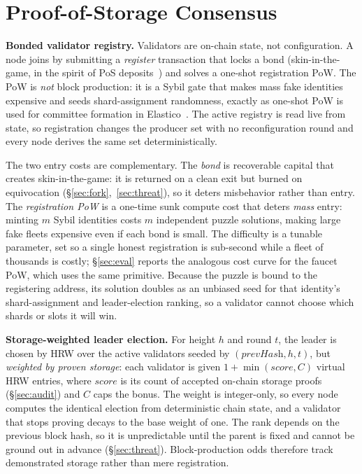 \section{Proof-of-Storage Consensus}
\label{sec:consensus}
\textbf{Bonded validator registry.} Validators are on-chain state, not configuration. A node
joins by submitting a \emph{register} transaction that locks a bond (skin-in-the-game, in the
spirit of PoS deposits~\cite{kiayias2017ouroboros,buterin2017casper}) and solves a one-shot
registration PoW. The PoW is \emph{not} block production: it is a Sybil gate that makes mass
fake identities expensive and seeds shard-assignment randomness, exactly as one-shot PoW is
used for committee formation in Elastico~\cite{luu2016elastico}. The active registry is read
live from state, so registration changes the producer set with no reconfiguration round and
every node derives the same set deterministically.

The two entry costs are complementary. The \emph{bond} is recoverable capital that creates
skin-in-the-game: it is returned on a clean exit but burned on equivocation
(\S\ref{sec:fork},~\ref{sec:threat}), so it deters misbehavior rather than entry. The
\emph{registration PoW} is a one-time sunk compute cost that deters \emph{mass} entry: minting $m$
Sybil identities costs $m$ independent puzzle solutions, making large fake fleets expensive even if
each bond is small. The difficulty is a tunable parameter, set so a single honest registration is
sub-second while a fleet of thousands is costly; \S\ref{sec:eval} reports the analogous cost curve
for the faucet PoW, which uses the same primitive. Because the puzzle is bound to the registering
address, its solution doubles as an unbiased seed for that identity's shard-assignment and
leader-election ranking, so a validator cannot choose which shards or slots it will win.

\textbf{Storage-weighted leader election.} For height $h$ and round $t$, the leader is chosen by
HRW over the active validators seeded by $(\textit{prevHash},h,t)$, but \emph{weighted by proven
storage}: each validator is given $1+\min(\textit{score},C)$ virtual HRW entries, where
$\textit{score}$ is its count of accepted on-chain storage proofs (\S\ref{sec:audit}) and $C$ caps
the bonus. The weight is integer-only, so every node computes the identical election from
deterministic chain state, and a validator that stops proving decays to the base weight of one. The
rank depends on the previous block hash, so it is unpredictable until the parent is fixed and cannot
be ground out in advance (\S\ref{sec:threat}). Block-production odds therefore track demonstrated
storage rather than mere registration.

